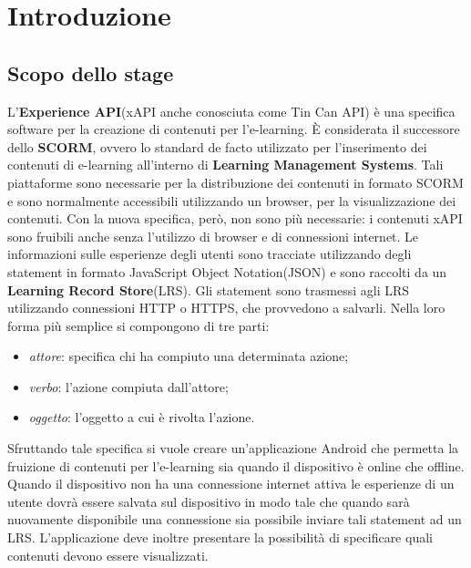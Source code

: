 \documentclass[../Tesi.tex]{subfiles}
\begin{document}
\section{Introduzione}
	
	\subsection{Scopo dello stage}
		L'\textbf{Experience API}(xAPI anche conosciuta come Tin Can API) è una specifica software per la creazione di contenuti per l'e-learning. È considerata il successore dello \textbf{SCORM}, ovvero lo standard de facto utilizzato per l'inserimento dei contenuti di e-learning all'interno di \textbf{Learning Management Systems}. Tali piattaforme sono necessarie per la distribuzione dei contenuti in formato SCORM e sono normalmente accessibili utilizzando un browser, per la visualizzazione dei contenuti. Con la nuova specifica, però, non sono più necessarie: i contenuti xAPI sono fruibili anche senza l'utilizzo di browser e di connessioni internet. Le informazioni sulle esperienze degli utenti sono tracciate utilizzando degli statement in formato JavaScript Object Notation(JSON) e sono raccolti da un \textbf{Learning Record Store}(LRS). Gli statement sono trasmessi agli LRS utilizzando connessioni HTTP o HTTPS, che provvedono a salvarli. Nella loro forma più semplice si compongono di tre parti: 
		\begin{itemize}
			\item \textit{attore}: specifica chi ha compiuto una determinata azione;
			\item \textit{verbo}: l'azione compiuta dall'attore;
			\item \textit{oggetto}: l'oggetto a cui è rivolta l'azione.
		\end{itemize}
		Sfruttando tale specifica si vuole creare un'applicazione Android che permetta la fruizione di contenuti per l'e-learning sia quando il dispositivo è online che offline. Quando il dispositivo non ha una connessione internet attiva le esperienze di un utente dovrà essere salvata sul dispositivo in modo tale che quando sarà nuovamente disponibile una connessione sia possibile inviare tali statement ad un LRS. L'applicazione deve inoltre presentare la possibilità di specificare quali contenuti devono essere visualizzati.
\end{document}
